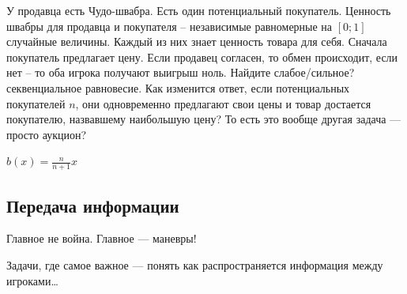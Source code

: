 \begin{problem}
У продавца есть Чудо-швабра. Есть один потенциальный покупатель. Ценность швабры для продавца и покупателя -- независимые равномерные на $[0;1]$ случайные величины. Каждый из них знает ценность товара для себя. Сначала покупатель предлагает цену. Если продавец согласен, то обмен происходит, если нет -- то оба игрока получают выигрыш ноль. Найдите {\red слабое/сильное? секвенциальное}  равновесие. Как изменится ответ, если потенциальных покупателей $n$, они одновременно предлагают свои цены и товар достается покупателю, назвавшему наибольшую цену? {\red То есть это вообще другая задача — просто аукцион?}



\begin{sol}
$b(x)=\frac{n}{n+1}x$
\end{sol}
\end{problem}




\subsection{Передача информации}

Главное не война. Главное — маневры!

Задачи, где самое важное —  понять как распространяется информация между игроками\ldots

